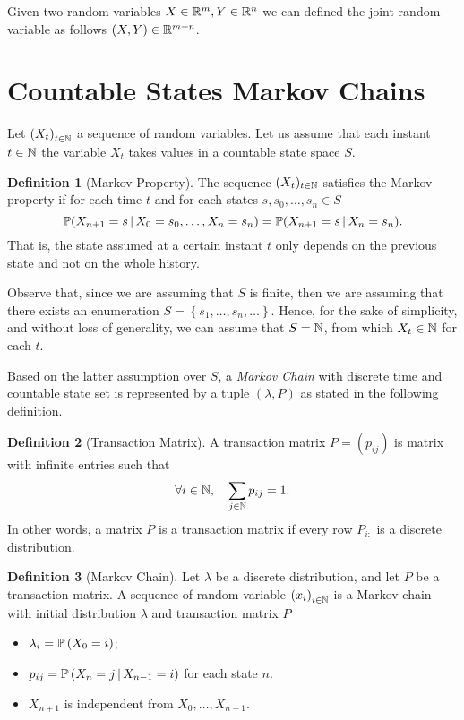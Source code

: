 \documentclass{report}
\theoremstyle{definition}
\newtheorem{defn}{Definition}
\begin{document}
Given two random variables $X\in\mathbb{R}^m,Y\in\mathbb{R}^n$ we can defined the
joint random variable as follows $(X,Y)\in\mathbb{R}^{m+n}$.
\section{Countable States Markov Chains}
Let $\left( X_t \right)_{t\in\mathbb{N}}$ a sequence of random variables. Let us
assume that each instant $t\in\mathbb{N}$ the variable $X_t$ takes values in a countable state space $S$. 
\begin{defn}[Markov Property]
The sequence $(X_t)_{t\in\mathbb{N}}$ satisfies the Markov property if for each time
$t$ and for each states $s,s_0,\dots,s_n\in S$
\begin{equation}
  \mathbb{P}(X_{n+1}=s\,\vert\,
  X_0=s_0,\dots,X_n=s_n)=\mathbb{P}(X_{n+1}=s\,\vert\, X_n=s_n).
  \label{eq:markov-property}
\end{equation}
That is, the state assumed at a certain instant $t$ only depends on the
previous state and not on the whole history.
\end{defn}

Observe that, since we are assuming that $S$ is finite, then we are assuming
that there exists an enumeration $S=\left\{ s_1,\dots,s_n,\dots \right\}$.
Hence,  for the sake of simplicity, and without loss of generality, we can
assume that $S=\mathbb{N}$, from which $X_t\in\mathbb{N}$ for each $t$.

Based on the latter assumption over $S$, a \textit{Markov Chain}  with
discrete time and countable state set is represented by a tuple 
$\left( \lambda,P \right)$ as stated in the following definition.

\begin{defn}[Transaction Matrix]
  A transaction matrix $P=\left( p_{ij} \right)$ is matrix with infinite entries 
  such that
  \begin{equation}
    \forall i\in\mathbb{N},\quad \sum_{j\in\mathbb{N}} p_{ij} = 1.
    \label{eq:transaction-matrix}
  \end{equation}
  In other words, a matrix $P$ is a transaction matrix if every row $P_{i:}$
  is a discrete distribution.
\end{defn}
\begin{defn}[Markov Chain]
  Let $\lambda$ be a discrete distribution, and let $P$ be a transaction
  matrix. A sequence of random variable $\left( x_i \right)_{i\in\mathbb{N}}$ is a
  Markov chain with initial distribution $\lambda$ and transaction matrix
  $P$ 
  \begin{itemize}
    \item $\lambda_i = \mathbb{P}\left( X_0=i \right)$;
    \item $p_{ij} = \mathbb{P}\left( X_n=j\,\vert\, X_{n-1}=i \right)$ for each
      state $n$.
    \item $X_{n+1}$ is independent from $X_0,\dots,X_{n-1}$.
  \end{itemize}
\end{defn}
\end{document}
